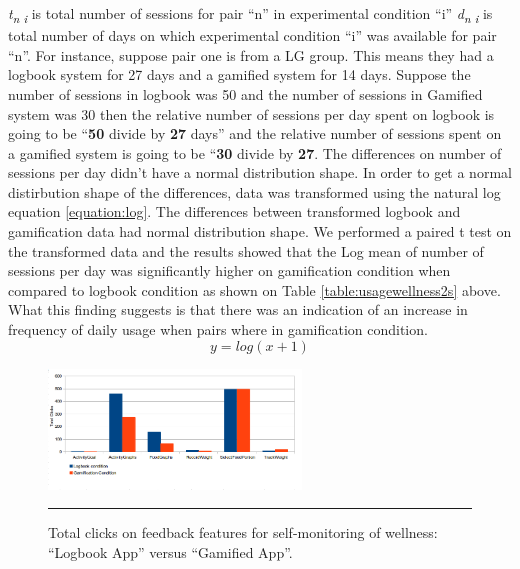 \documentclass{sig-alternate}
\def\SB#1{\textsubscript{\textcolor{black}{#1}}}
\begin{document}
\emph{t\SB{n i}} is total number of sessions for pair ``n'' in experimental condition ``i''\newline
\emph{d\SB{n i}} is total number of days on which experimental condition ``i'' was available for pair ``n''.\newline
For instance, suppose pair one is from a LG group. This means they had  a logbook system for 27 days and a gamified system for 14 days. Suppose the number of sessions in logbook was 50 and the number of sessions in Gamified system was 30 then the relative number of sessions per day spent on logbook is going to be ``\textbf{50} divide by \textbf{27} days'' and the relative number of sessions spent on  a gamified system is going to be ``\textbf{30} divide by \textbf{27}.\newline
The differences on number of sessions per day didn't have a normal distribution shape. In order to get a normal distirbution shape of the differences, data was transformed using the natural log equation \ref{equation:log}. The differences between transformed logbook and gamification data had normal distribution shape. We performed a paired t test on the transformed data and the results showed that the Log mean of number of sessions per day was significantly higher on gamification condition when compared to logbook condition as shown on Table \ref{table:usagewellness2s} above. What this finding suggests is that there was an indication of an increase in frequency of daily usage when pairs where in gamification condition.\newline
\begin{equation}
\label{equation:log}
y=log (x+1)
\end{equation}\newline
\begin{figure}[htbp]
  \centering
    \includegraphics[width=0.6\textwidth]{self_monitoring_usage.png}
    \rule{35em}{0.5pt}
  \caption{Total clicks on feedback features for self-monitoring of wellness: ``Logbook App'' versus ``Gamified App''.}
  \label{figure:self_monitoring_usage}
\end{figure}\newline
\end{document}
